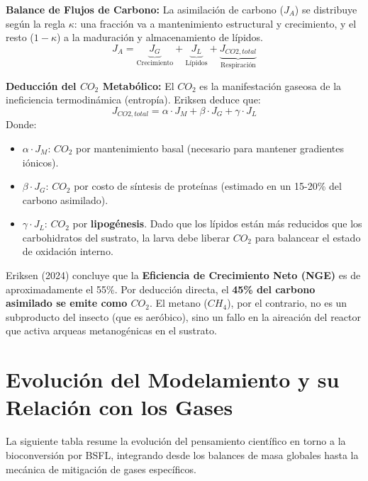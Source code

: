 \documentclass{article}
\begin{document}
\textbf{Balance de Flujos de Carbono:}
La asimilación de carbono ($J_A$) se distribuye según la regla $\kappa$: una fracción va a mantenimiento estructural y crecimiento, y el resto ($1-\kappa$) a la maduración y almacenamiento de lípidos.
\begin{equation}
    J_A = \underbrace{J_G}_{\text{Crecimiento}} + \underbrace{J_L}_{\text{Lípidos}} + \underbrace{J_{CO2,total}}_{\text{Respiración}}
\end{equation}

\textbf{Deducción del $CO_2$ Metabólico:}
El $CO_2$ es la manifestación gaseosa de la ineficiencia termodinámica (entropía). Eriksen deduce que:
\begin{equation}
    J_{CO2,total} = \alpha \cdot J_M + \beta \cdot J_G + \gamma \cdot J_L
\end{equation}
Donde:
\begin{itemize}
    \item $\alpha \cdot J_M$: $CO_2$ por mantenimiento basal (necesario para mantener gradientes iónicos).
    \item $\beta \cdot J_G$: $CO_2$ por costo de síntesis de proteínas (estimado en un 15-20\% del carbono asimilado).
    \item $\gamma \cdot J_L$: $CO_2$ por \textbf{lipogénesis}. Dado que los lípidos están más reducidos que los carbohidratos del sustrato, la larva debe liberar $CO_2$ para balancear el estado de oxidación interno.
\end{itemize}

Eriksen (2024) concluye que la \textbf{Eficiencia de Crecimiento Neto (NGE)} es de aproximadamente el 55\%. Por deducción directa, el \textbf{45\% del carbono asimilado se emite como $CO_2$}. El metano ($CH_4$), por el contrario, no es un subproducto del insecto (que es aeróbico), sino un fallo en la aireación del reactor que activa arqueas metanogénicas en el sustrato.



\section{Evolución del Modelamiento y su Relación con los Gases}

La siguiente tabla resume la evolución del pensamiento científico en torno a la bioconversión por BSFL, integrando desde los balances de masa globales hasta la mecánica de mitigación de gases específicos.
\end{document}

